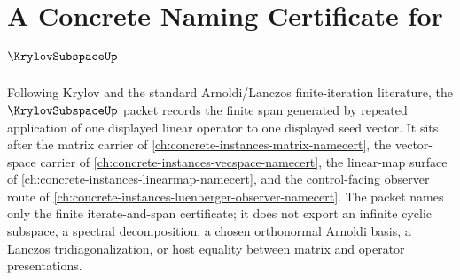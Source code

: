 \chapter{A Concrete Naming Certificate for $\KrylovSubspaceUp$}
\label{ch:concrete-instances-krylov-subspace-namecert}

Following Krylov and the standard Arnoldi/Lanczos finite-iteration literature, the $\KrylovSubspaceUp$ packet records the finite span generated by repeated application of one displayed linear operator to one displayed seed vector. It sits after the matrix carrier of \autoref{ch:concrete-instances-matrix-namecert}, the vector-space carrier of \autoref{ch:concrete-instances-vecspace-namecert}, the linear-map surface of \autoref{ch:concrete-instances-linearmap-namecert}, and the control-facing observer route of \autoref{ch:concrete-instances-luenberger-observer-namecert}. The packet names only the finite iterate-and-span certificate; it does not export an infinite cyclic subspace, a spectral decomposition, a chosen orthonormal Arnoldi basis, a Lanczos tridiagonalization, or host equality between matrix and operator presentations.

